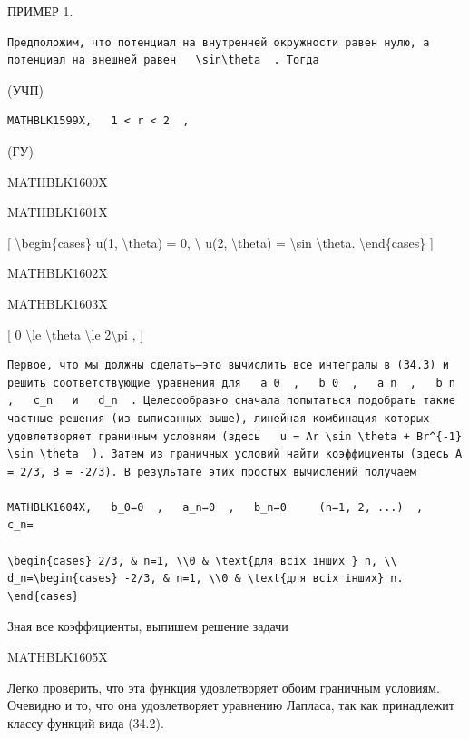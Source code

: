 \documentclass[
]{article}
\begin{document}
ПРИМЕР 1.

\begin{verbatim}
Предположим, что потенциал на внутренней окружности равен нулю, а потенциал на внешней равен   \sin\theta  . Тогда
\end{verbatim}

(УЧП)

\begin{verbatim}
MATHBLK1599X,   1 < r < 2  ,
\end{verbatim}

(ГУ)

MATHBLK1600X

MATHBLK1601X

{[} \textbackslash begin\{cases\} u(1, \textbackslash theta) = 0,
\textbackslash{} u(2, \textbackslash theta) = \textbackslash sin
\textbackslash theta. \textbackslash end\{cases\} {]}

MATHBLK1602X

MATHBLK1603X

{[} 0 \textbackslash le \textbackslash theta \textbackslash le
2\textbackslash pi , {]}

\begin{verbatim}
Первое, что мы должны сделать—это вычислить все интегралы в (34.3) и решить соответствующие уравнения для   a_0  ,   b_0  ,   a_n  ,   b_n  ,   c_n   и   d_n  . Целесообразно сначала попытаться подобрать такие частные решения (из выписанных выше), линейная комбинация которых удовлетворяет граничным условням (здесь   u = Ar \sin \theta + Br^{-1} \sin \theta  ). Затем из граничных условий найти коэффициенты (здесь A = 2/3, B = -2/3). В результате этих простых вычислений получаем

MATHBLK1604X,   b_0=0  ,   a_n=0  ,   b_n=0     (n=1, 2, ...)  ,   c_n=

\begin{cases} 2/3, & n=1, \\0 & \text{для всіх інших } n, \\ d_n=\begin{cases} -2/3, & n=1, \\0 & \text{для всіх інших} n. \end{cases}
\end{verbatim}

Зная все коэффициенты, выпишем решение задачи

MATHBLK1605X

Легко проверить, что эта функция удовлетворяет обоим граничным условиям.
Очевидно и то, что она удовлетворяет уравнению Лапласа, так как
принадлежит классу функций вида (34.2).
\end{document}
